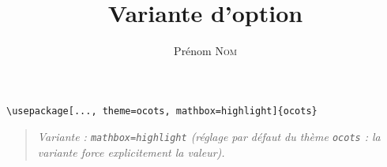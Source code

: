 \documentclass[11pt]{ocots-book}
\title{Variante d'option}
\author{Prénom \textsc{Nom}}
\newcommand{\ocotsvariantnote}[1]{\begin{quote}\itshape Variante : #1\end{quote}}
\begin{document}
\maketitle

\begin{lstlisting}
\usepackage[..., theme=ocots, mathbox=highlight]{ocots}
\end{lstlisting}
\ocotsvariantnote{\texttt{mathbox=highlight} (r\'eglage par d\'efaut du th\`eme \texttt{ocots} : la variante force explicitement la valeur).}

\end{document}
